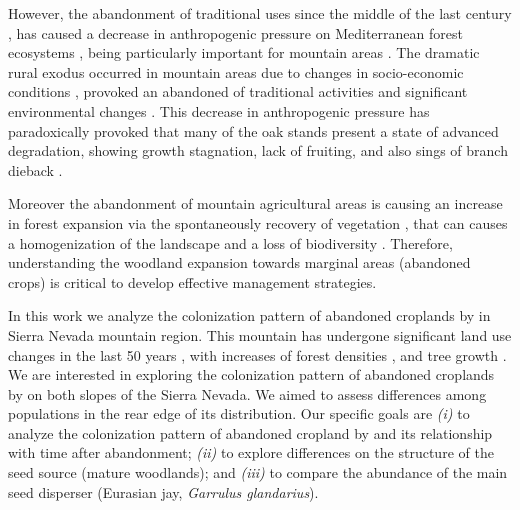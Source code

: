 However, the abandonment of traditional uses since the middle of the last century \autocites{MacDonaldetal2000AgriculturalAbandonment}, has caused a decrease in anthropogenic pressure on Mediterranean forest ecosystems \autocites{ValbuenaCarabanaetal2010HistoricalRecent}, being particularly important for mountain areas \autocites{Nataleetal2007StudyTree, AlvarezMartinezetal2014InfluenceLand,JimenezOlivenciaetal2015MedioSiglo,JimenezOlivenciaetal2015EvolucionUsos,Piasetal2014ColonizationAbandoned}. The dramatic rural exodus occurred in mountain areas due to changes in socio-economic conditions \autocites{EuropeanEnvironmentAgency2010EuropeEcological}, provoked an abandoned of traditional activities and significant environmental changes \autocites{MacDonaldetal2000AgriculturalAbandonment, Nataleetal2007StudyTree, AlvarezMartinezetal2014InfluenceLand,Piussi2000ExpansionEuropean,Rutherfordetal2008AssessingLanduse,Zimmermannetal2010EffectsLanduse}. This decrease in anthropogenic pressure has paradoxically provoked that many of the \Qp oak stands present a state of advanced degradation, showing growth stagnation, lack of fruiting, and also sings of branch dieback  \autocites{Canellasetal2004GrowthResponse, Bravoetal2008SelviculturaMontes, ValbuenaCarabanaGil2014EfectosGestion, PiqueVericat2015EvolutionPerspectives, Piqueetal2018Spain}. 

Moreover the abandonment of mountain agricultural areas is causing an increase in forest expansion via the spontaneously recovery of vegetation \autocites{Piussi2000ExpansionEuropean}, that can causes a homogenization of the landscape \autocites{Mietkiewiczetal2017LongtermChange} and a loss of biodiversity \autocites{Zimmermannetal2010EffectsLanduse}. Therefore, understanding the woodland expansion towards marginal areas (abandoned crops) is critical to develop effective management strategies. 

In this work we analyze the colonization pattern of abandoned croplands by \Qpy in Sierra Nevada mountain region. This mountain has undergone significant land use changes in the last 50 years \autocites{JimenezOlivenciaetal2015EvolucionUsos}, with increases of forest densities \autocite[see chapter \ref{sec:carbon}; also][]{JimenezOlivenciaetal2015MedioSiglo}, and tree growth \autocite[see chapter \ref{sec:dendro};][]{PerezLuqueetal2020LanduseLegacies}. We are interested in exploring the colonization pattern of abandoned croplands by \Qp on both slopes of the Sierra Nevada. We aimed to assess differences among populations in the rear edge of its distribution. Our specific goals are \emph{(i)} to analyze the colonization pattern of abandoned cropland by \Qp and its relationship with time after abandonment; \emph{(ii)} to explore differences on the structure of the seed source (mature woodlands); and \emph{(iii)} to compare the abundance of the main seed disperser (Eurasian jay, \emph{Garrulus glandarius}).

